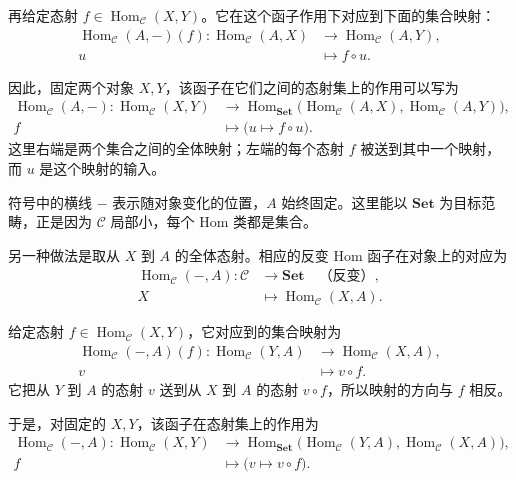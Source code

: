 再给定态射 \(f\in\operatorname{Hom}_{\mathcal C}(X,Y)\)。它在这个函子作用下对应到下面的集合映射：
\[
	\begin{aligned}
		\operatorname{Hom}_{\mathcal C}(A,-)(f): \operatorname{Hom}_{\mathcal C}(A,X)&\longrightarrow \operatorname{Hom}_{\mathcal C}(A,Y),\\
		u&\longmapsto f\circ u.
	\end{aligned}
\]

因此，固定两个对象 \(X,Y\)，该函子在它们之间的态射集上的作用可以写为
\[
	\begin{aligned}
		\operatorname{Hom}_{\mathcal C}(A,-): \operatorname{Hom}_{\mathcal C}(X,Y)&\longrightarrow \operatorname{Hom}_{\mathbf{Set}}\bigl( \operatorname{Hom}_{\mathcal C}(A,X), \operatorname{Hom}_{\mathcal C}(A,Y)\bigr),\\
		f&\longmapsto\bigl(u\longmapsto f\circ u\bigr).
	\end{aligned}
\]
这里右端是两个集合之间的全体映射；左端的每个态射 \(f\) 被送到其中一个映射，而 \(u\) 是这个映射的输入。

\ProseParagraphBreak
符号中的横线 \(-\) 表示随对象变化的位置，\(A\) 始终固定。这里能以 \(\mathbf{Set}\) 为目标范畴，正是因为 \(\mathcal C\) 局部小，每个 Hom 类都是集合。

\ProseParagraphBreak
另一种做法是取从 \(X\) 到 \(A\) 的全体态射。相应的反变 Hom 函子在对象上的对应为
\[
	\begin{aligned}
		\operatorname{Hom}_{\mathcal C}(-,A):\mathcal C&\longrightarrow\mathbf{Set} \quad\text{（反变）},\\
		X&\longmapsto\operatorname{Hom}_{\mathcal C}(X,A).
	\end{aligned}
\]

给定态射 \(f\in\operatorname{Hom}_{\mathcal C}(X,Y)\)，它对应到的集合映射为
\[
	\begin{aligned}
		\operatorname{Hom}_{\mathcal C}(-,A)(f): \operatorname{Hom}_{\mathcal C}(Y,A)&\longrightarrow \operatorname{Hom}_{\mathcal C}(X,A),\\
		v&\longmapsto v\circ f.
	\end{aligned}
\]
它把从 \(Y\) 到 \(A\) 的态射 \(v\) 送到从 \(X\) 到 \(A\) 的态射 \(v\circ f\)，所以映射的方向与 \(f\) 相反。

\ProseParagraphBreak
于是，对固定的 \(X,Y\)，该函子在态射集上的作用为
\[
	\begin{aligned}
		\operatorname{Hom}_{\mathcal C}(-,A): \operatorname{Hom}_{\mathcal C}(X,Y)&\longrightarrow \operatorname{Hom}_{\mathbf{Set}}\bigl( \operatorname{Hom}_{\mathcal C}(Y,A), \operatorname{Hom}_{\mathcal C}(X,A)\bigr),\\
		f&\longmapsto\bigl(v\longmapsto v\circ f\bigr).
	\end{aligned}
\]

